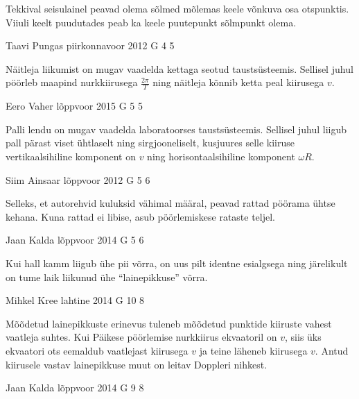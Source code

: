 \documentclass[11pt]{article}
\begin{document}
{{\ifHint
Tekkival seisulainel peavad olema sõlmed mõlemas keele võnkuva osa otspunktis. Viiuli keelt puudutades peab ka keele puutepunkt sõlmpunkt olema.
\fi
}

{Taavi Pungas} %
{piirkonnavoor} %
{2012} %
{G 4} %
{5} %
{

\ifHint
Näitleja liikumist on mugav vaadelda kettaga seotud taustsüsteemis. Sellisel juhul pöörleb maapind nurkkiirusega $\frac{2\pi}{T}$ ning näitleja kõnnib ketta peal kiirusega $v$.
\fi
}

{Eero Vaher} %
{lõppvoor} %
{2015} %
{G 5} %
{5} %
{

\ifHint
Palli lendu on mugav vaadelda laboratoorses taustsüsteemis. Sellisel juhul liigub pall pärast viset ühtlaselt ning sirgjooneliselt, kusjuures selle kiiruse vertikaalsihiline komponent on $v$ ning horisontaalsihiline komponent $\omega R$.
\fi
}

{Siim Ainsaar} %
{lõppvoor} %
{2012} %
{G 5} %
{6} %
{

\ifHint
Selleks, et autorehvid kuluksid vähimal määral, peavad rattad pöörama ühtse kehana. Kuna rattad ei libise, asub pöörlemiskese rataste teljel.
\fi
}

{Jaan Kalda} %
{lõppvoor} %
{2014} %
{G 5} %
{6} %
{

\ifHint
Kui hall kamm liigub ühe pii võrra, on uus pilt identne esialgsega ning järelikult on tume laik liikunud ühe \enquote{lainepikkuse} võrra.
\fi
}

{Mihkel Kree} %
{lahtine} %
{2014} %
{G 10} %
{8} %
{

\ifHint
Mõõdetud lainepikkuste erinevus tuleneb mõõdetud punktide kiiruste vahest vaatleja suhtes. Kui Päikese pöörlemise nurkkiirus ekvaatoril on $v$, siis üks ekvaatori ots eemaldub vaatlejast kiirusega $v$ ja teine läheneb kiirusega $v$. Antud kiirusele vastav lainepikkuse muut on leitav Doppleri nihkest.
\fi
}

{Jaan Kalda} %
{lõppvoor} %
{2014} %
{G 9} %
{8} %
{

}}
\end{document}
